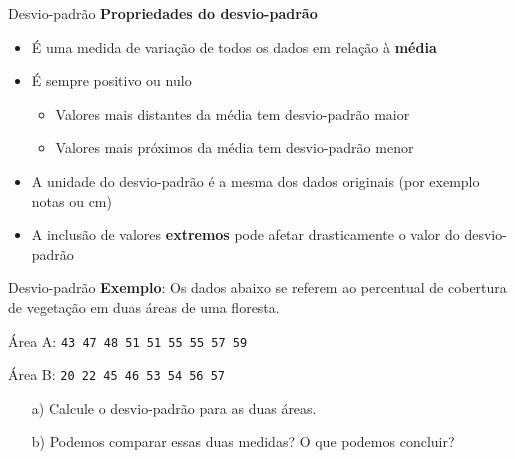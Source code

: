 \documentclass[10pt]{beamer}\usepackage[]{graphicx}\usepackage[]{color}
\theoremstyle{definition}
\begin{document}
\begin{frame}{Desvio-padrão}
  \textbf{Propriedades do desvio-padrão} \vspace{1em}
  \begin{itemize}
  \item É uma medida de variação de todos os dados em relação à
    \textbf{média}
  \item É sempre positivo ou nulo
    \begin{itemize}
    \item Valores mais distantes da média tem desvio-padrão maior
    \item Valores mais próximos da média tem desvio-padrão menor
    \end{itemize}
  \item A unidade do desvio-padrão é a mesma dos dados originais (por
    exemplo notas ou cm)
  \item A inclusão de valores \textbf{extremos} pode afetar
    drasticamente o valor do desvio-padrão
  \end{itemize}
\end{frame}




\begin{frame}{Desvio-padrão}
  \textbf{Exemplo}: Os dados abaixo se referem ao percentual de
  cobertura de vegetação em duas áreas de uma floresta.
  \begin{flushleft}
    Área A: \texttt{43 47 48 51 51 55 55 57 59}
  \end{flushleft}
  \begin{flushleft}
    Área B: \texttt{20 22 45 46 53 54 56 57}
  \end{flushleft}
  \begin{itemize}
  \item[a)] Calcule o desvio-padrão para as duas áreas.
  \item[b)] Podemos comparar essas duas medidas? O que podemos concluir?
  \end{itemize}
\end{frame}
\end{document}
